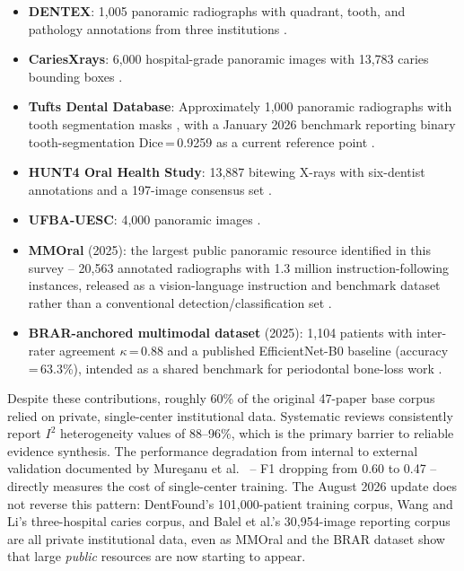 \documentclass[conference]{IEEEtran}
\begin{document}
\begin{itemize}
  \item \textbf{DENTEX}: 1,005 panoramic radiographs with quadrant,
        tooth, and pathology annotations from three institutions
        \cite{nassiri2025yolo,vannistelrooij2024combining,bizjak2024advancing}.
  \item \textbf{CariesXrays}: 6,000 hospital-grade panoramic images
        with 13,783 caries bounding boxes \cite{chen2024cariesxrays}.
  \item \textbf{Tufts Dental Database}: Approximately 1,000 panoramic
        radiographs with tooth segmentation masks
        \cite{cerda2024determining,kim2024unsupervised,zhang2025reliable,yaswanth2025automated},
        with a January 2026 benchmark reporting binary tooth-segmentation
        Dice\,=\,0.9259 as a current reference point
        \cite{yalim2026comparative}.
  \item \textbf{HUNT4 Oral Health Study}: 13,887 bitewing X-rays with
        six-dentist annotations and a 197-image consensus set
        \cite{perez2024ai}.
  \item \textbf{UFBA-UESC}: 4,000 panoramic images
        \cite{asadi2024detection}.
  \item \textbf{MMOral} (2025): the largest public panoramic resource
        identified in this survey -- 20,563 annotated radiographs with
        1.3 million instruction-following instances, released as a
        vision-language instruction and benchmark dataset rather than
        a conventional detection/classification set
        \cite{hao2025mmoral}.
  \item \textbf{BRAR-anchored multimodal dataset} (2025): 1,104
        patients with inter-rater agreement $\kappa$\,=\,0.88 and a
        published EfficientNet-B0 baseline (accuracy\,=\,63.3\%),
        intended as a shared benchmark for periodontal bone-loss work
        \cite{xia2025brar}.
\end{itemize}

Despite these contributions, roughly 60\% of the original 47-paper
base corpus relied on private, single-center institutional data.
Systematic reviews
\cite{iacob2025automated,albano2024artificial,luke2025accuracy,bonfanti2025deep,khubrani2025detection}
consistently report $I^2$ heterogeneity values of 88--96\%, which is the
primary barrier to reliable evidence synthesis. The performance
degradation from internal to external validation documented by
Mure\c{s}anu et al.~\cite{muresanu2024automating} -- F1 dropping from
0.60 to 0.47 -- directly measures the cost of single-center training.
The August 2026 update does not reverse this pattern: DentFound's
101,000-patient training corpus, Wang and Li's three-hospital caries
corpus, and Balel et al.'s 30,954-image reporting corpus
\cite{zhu2026dentfound,wang2026transformer,balel2026hybrid} are all
private institutional data, even as MMOral and the BRAR dataset show
that large \emph{public} resources are now starting to appear.
\end{document}
